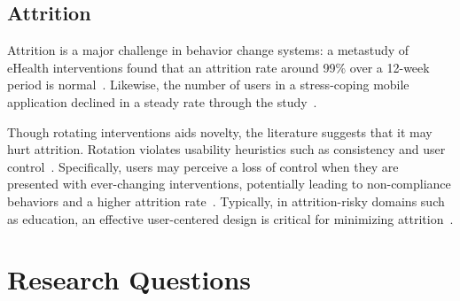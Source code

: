 


\subsection{Attrition}

Attrition is a major challenge in behavior change systems: a metastudy of eHealth interventions found that an attrition rate around 99\% over a 12-week period is normal~\cite{eysenbach2005law}. %
Likewise, the number of users in a stress-coping mobile application declined in a steady rate through the study~\cite{paredes2014poptherapy}. 

Though rotating interventions aids novelty, the literature suggests that it may hurt attrition. Rotation violates usability heuristics such as consistency and user control~\cite{nielsen199510}. Specifically, users may perceive a loss of control when they are presented with ever-changing interventions, %
potentially leading to non-compliance behaviors and a higher attrition
rate~\cite{coco2018hiniker}. %
Typically, in attrition-risky domains such as education, an effective user-centered design is critical for minimizing attrition~\cite{Angelino2007learning}. %




\section{Research Questions}

